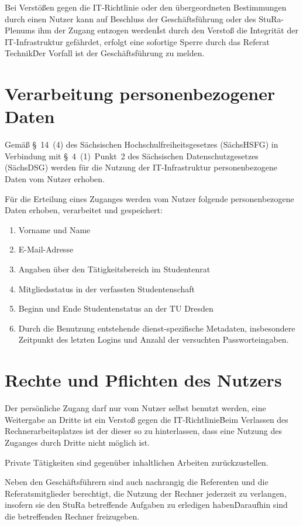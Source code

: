 \begin{multicols}{2}
\Abs \Satz Bei Verstößen gegen die IT-Richtlinie oder den übergeordneten Bestimmungen durch einen Nutzer kann auf Beschluss der Geschäftsführung oder des StuRa-Plenums ihm der Zugang entzogen werden\. Ist durch den Verstoß die Integrität der IT-Infrastruktur gefährdet, erfolgt eine sofortige Sperre durch das Referat Technik\. Der Vorfall ist der Geschäftsführung zu melden. 


\section{Verarbeitung personenbezogener Daten}

\Abs \Satz Gemäß §~14~(4) des Sächsischen Hochschulfreiheitsgesetzes (SächsHSFG) in Verbindung mit §~4~(1)~Punkt~2 des Sächsischen Datenschutzgesetzes (SächsDSG) werden für die Nutzung der IT-Infrastruktur personenbezogene Daten vom Nutzer erhoben. 

\Abs \Satz Für die Erteilung eines Zuganges werden vom Nutzer folgende personenbezogene Daten erhoben, verarbeitet und gespeichert: 
\begin{enumerate}
\item Vorname und Name
\item E-Mail-Adresse
\item Angaben über den Tätigkeitsbereich im Studentenrat
\item Mitgliedsstatus in der verfassten Studentenschaft
\item Beginn und Ende Studentenstatus an der TU Dresden 
\item Durch die Benutzung entstehende dienst-spezifische Metadaten, insbesondere Zeitpunkt des letzten Logins und Anzahl der versuchten Passworteingaben.
\end{enumerate}

\section{Rechte und Pflichten des Nutzers}

\Abs \Satz Der persönliche Zugang darf nur vom Nutzer selbst benutzt werden, eine Weitergabe an Dritte ist ein Verstoß gegen die IT-Richtlinie\. Beim Verlassen des Rechnerarbeitsplatzes ist der dieser so zu hinterlassen, dass eine Nutzung des Zuganges durch Dritte nicht möglich ist.

\Abs \Satz Private Tätigkeiten sind gegenüber inhaltlichen Arbeiten zurückzustellen. 

\Abs \Satz Neben den Geschäftsführern sind auch nachrangig die Referenten und die Referatsmitglieder berechtigt, die Nutzung der Rechner jederzeit zu verlangen, insofern sie den StuRa betreffende Aufgaben zu erledigen haben\. Daraufhin sind die betreffenden Rechner freizugeben.


\end{multicols}
